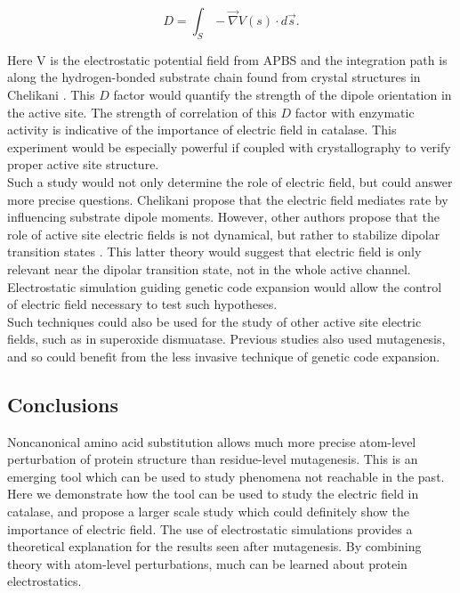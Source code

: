 \documentclass[9pt,twocolumn,twoside]{pnas-new}
\begin{document}
\begin{equation*}
  D = \int_S -\vec{\nabla} V(s) \cdot d\vec{s}.
\end{equation*}

Here V is the electrostatic potential field from APBS and the integration path is along the hydrogen-bonded substrate chain found from crystal structures in Chelikani \cite{electricpotential}. This $D$ factor would quantify the strength of the dipole orientation in the active site. The strength of correlation of this $D$ factor with enzymatic activity is indicative of the importance of electric field in catalase. This experiment would be especially powerful if coupled with crystallography to verify proper active site structure.\\

Such a study would not only determine the role of electric field, but could answer more precise questions. Chelikani propose that the electric field mediates rate by influencing substrate dipole moments. However, other authors propose that the role of active site electric fields is not dynamical, but rather to stabilize dipolar transition states \cite{asdipolestabilization}. This latter theory would suggest that electric field is only relevant near the dipolar transition state, not in the whole active channel. Electrostatic simulation guiding genetic code expansion would allow the control of electric field necessary to test such hypotheses.\\

Such techniques could also be used for the study of other active site electric fields, such as in superoxide dismuatase. Previous studies \cite{concentrated-as-efield-sod} also used mutagenesis, and so could benefit from the less invasive technique of genetic code expansion.\\

\subsection*{Conclusions}
Noncanonical amino acid substitution allows much more precise atom-level perturbation of protein structure than residue-level mutagenesis. This is an emerging tool which can be used to study phenomena not reachable in the past. Here we demonstrate how the tool can be used to study the electric field in catalase, and propose a larger scale study which could definitely show the importance of electric field. The use of electrostatic simulations provides a theoretical explanation for the results seen after mutagenesis. By combining theory with atom-level perturbations, much can be learned about protein electrostatics.
\end{document}
